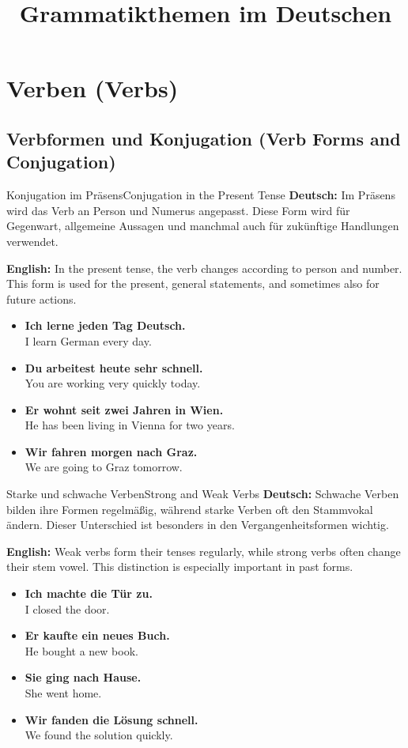 \documentclass[a4paper,11pt]{article}
\title{Grammatikthemen im Deutschen}
\date{}
\newcommand{\GermanText}[1]{\textbf{Deutsch: }#1\par}
\newcommand{\EnglishText}[1]{{\color{SoftGray}\textbf{English: }#1\par}}
\newcommand{\ExampleItem}[2]{\item \textbf{#1}\\{\color{SoftGray}#2}}
\begin{document}
    \maketitle
    \tableofcontents
    \newpage

\section{Verben {\small (Verbs)}}

\subsection{Verbformen und Konjugation {\small (Verb Forms and Conjugation)}}

\begin{grammarentry}{Konjugation im Präsens}{Conjugation in the Present Tense}
    \GermanText{Im Präsens wird das Verb an Person und Numerus angepasst. Diese Form wird für Gegenwart, allgemeine Aussagen und manchmal auch für zukünftige Handlungen verwendet.}
    \EnglishText{In the present tense, the verb changes according to person and number. This form is used for the present, general statements, and sometimes also for future actions.}
    \begin{exbox}
        \begin{itemize}
            \ExampleItem{Ich lerne jeden Tag Deutsch.}{I learn German every day.}
            \ExampleItem{Du arbeitest heute sehr schnell.}{You are working very quickly today.}
            \ExampleItem{Er wohnt seit zwei Jahren in Wien.}{He has been living in Vienna for two years.}
            \ExampleItem{Wir fahren morgen nach Graz.}{We are going to Graz tomorrow.}
        \end{itemize}
    \end{exbox}
\end{grammarentry}

\begin{grammarentry}{Starke und schwache Verben}{Strong and Weak Verbs}
    \GermanText{Schwache Verben bilden ihre Formen regelmäßig, während starke Verben oft den Stammvokal ändern. Dieser Unterschied ist besonders in den Vergangenheitsformen wichtig.}
    \EnglishText{Weak verbs form their tenses regularly, while strong verbs often change their stem vowel. This distinction is especially important in past forms.}
    \begin{exbox}
        \begin{itemize}
            \ExampleItem{Ich machte die Tür zu.}{I closed the door.}
            \ExampleItem{Er kaufte ein neues Buch.}{He bought a new book.}
            \ExampleItem{Sie ging nach Hause.}{She went home.}
            \ExampleItem{Wir fanden die Lösung schnell.}{We found the solution quickly.}
        \end{itemize}
    \end{exbox}
\end{grammarentry}
\end{document}

